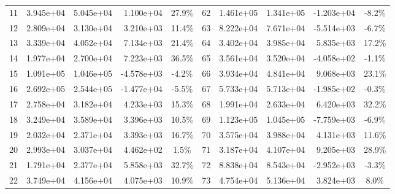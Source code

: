 \begin{table}
\begin{tabular}{|c|r|r|r|c||c|r|r|r|c|}
        11          & 3.945e+04        & 5.045e+04      & 1.100e+04       & 27.9\%               & 62          & 1.461e+05        & 1.341e+05      & -1.203e+04      & -8.2\%               \\
        12          & 2.809e+04        & 3.130e+04      & 3.210e+03       & 11.4\%               & 63          & 8.222e+04        & 7.671e+04      & -5.514e+03      & -6.7\%               \\
        13          & 3.339e+04        & 4.052e+04      & 7.134e+03       & 21.4\%               & 64          & 3.402e+04        & 3.985e+04      & 5.835e+03       & 17.2\%               \\
        14          & 1.977e+04        & 2.700e+04      & 7.223e+03       & 36.5\%               & 65          & 3.561e+04        & 3.520e+04      & -4.058e+02      & -1.1\%               \\
        15          & 1.091e+05        & 1.046e+05      & -4.578e+03      & -4.2\%               & 66          & 3.934e+04        & 4.841e+04      & 9.068e+03       & 23.1\%               \\
        16          & 2.692e+05        & 2.544e+05      & -1.477e+04      & -5.5\%               & 67          & 5.733e+04        & 5.713e+04      & -1.985e+02      & -0.3\%               \\
        17          & 2.758e+04        & 3.182e+04      & 4.233e+03       & 15.3\%               & 68          & 1.991e+04        & 2.633e+04      & 6.420e+03       & 32.2\%               \\
        18          & 3.249e+04        & 3.589e+04      & 3.396e+03       & 10.5\%               & 69          & 1.123e+05        & 1.045e+05      & -7.759e+03      & -6.9\%               \\
        19          & 2.032e+04        & 2.371e+04      & 3.393e+03       & 16.7\%               & 70          & 3.575e+04        & 3.988e+04      & 4.131e+03       & 11.6\%               \\
        20          & 2.993e+04        & 3.037e+04      & 4.462e+02       & 1.5\%                & 71          & 3.187e+04        & 4.107e+04      & 9.205e+03       & 28.9\%               \\
        21          & 1.791e+04        & 2.377e+04      & 5.858e+03       & 32.7\%               & 72          & 8.838e+04        & 8.543e+04      & -2.952e+03      & -3.3\%               \\
        22          & 3.749e+04        & 4.156e+04      & 4.075e+03       & 10.9\%               & 73          & 4.754e+04        & 5.136e+04      & 3.824e+03       & 8.0\%                \\

\end{tabular}
\end{table}
